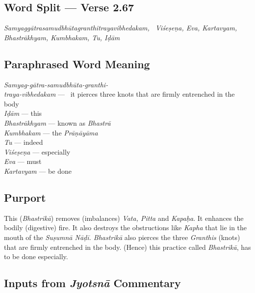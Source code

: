 \subsection*{Word Split --- Verse 2.67}


\textit{Samyaggātrasamudbhūtagranthitrayavibhedakam,  Viśeṣeṇa, Eva, Kartavyam, Bhastrākhyam, Kumbhakam, Tu, Iḍām}

\subsection*{Paraphrased Word Meaning}


\begin{multicols}{2}
\textit{Samyag-gātra-samudbhūta-granthi-\\traya-vibhedakam} ---  it  pierces three knots that are firmly entrenched  in the body\\
\textit{Iḍām}  --- this \\
\textit{Bhastrākhyam} --- known as \textit{Bhastrā}\\
\textit{Kumbhakam} --- the \textit{Prāṇāyāma} \\
\textit{Tu} --- indeed \\
\textit{Viśeṣeṇa} --- especially \\
\textit{Eva} --- must \\
\textit{Kartavyam} --- be done
\end{multicols}

\subsection*{Purport}


This (\textit{Bhastrikā}) removes (imbalances) \textit{Vata, Pitta} and \textit{Kapaḥa}. It enhances the bodily (digestive) fire. It also destroys the obstructions like \textit{Kapha} that lie in the mouth of the  \textit{Suṣumnā Nāḍī. Bhastrikā} also pierces the three  \textit{Granthis} (knots) that are firmly entrenched in the body. (Hence) this practice called  \textit{Bhastrikā}, has to be done especially.

\subsection*{Inputs from \textit{Jyotsnā} Commentary}


